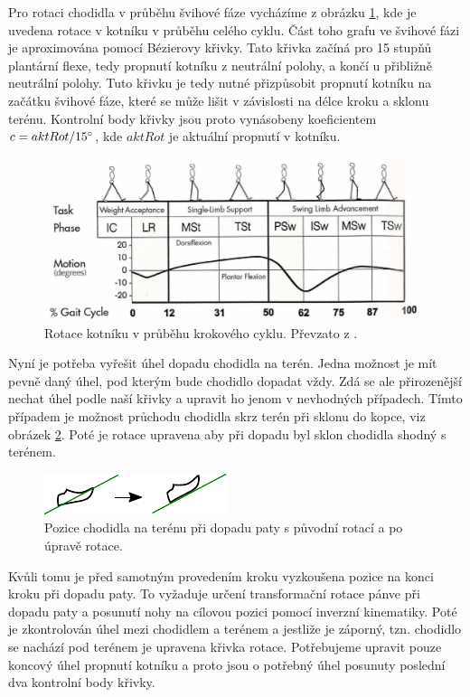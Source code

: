 Pro rotaci chodidla v průběhu švihové fáze vycházíme z obrázku \ref{fig:ankleRot}, kde je uvedena rotace v kotníku v průběhu celého cyklu. Část toho grafu ve švihové fázi je aproximována pomocí Bézierovy křivky. Tato křivka začíná pro 15 stupňů plantární flexe, tedy propnutí kotníku z neutrální polohy, a končí u přibližně neutrální polohy. Tuto křivku je tedy nutné přizpůsobit propnutí kotníku na začátku švihové fáze, které se může lišit v závislosti na délce kroku a sklonu terénu. Kontrolní body křivky jsou proto vynásobeny koeficientem $c = aktRot / 15\degree$, kde $aktRot$ je aktuální propnutí v kotníku. 

\begin{figure}[h]
	\centering
	\includegraphics[width=0.9\linewidth]{fig/ankle_kinematics.png}
	\caption{Rotace kotníku v průběhu krokového cyklu. Převzato z \cite{biomechanika_chuze}.}
	\label{fig:ankleRot}
\end{figure}

Nyní je potřeba vyřešit úhel dopadu chodidla na terén.  Jedna možnost je mít pevně daný úhel, pod kterým bude chodidlo dopadat vždy. Zdá se ale přirozenější nechat úhel podle naší křivky a upravit ho jenom v nevhodných případech. Tímto případem je možnost průchodu chodidla skrz terén při sklonu do kopce, viz obrázek \ref{fig:swingRotFix}. Poté je rotace upravena aby při dopadu byl sklon chodidla shodný s terénem. 

\begin{figure}[h]
	\centering
	\includegraphics[width=0.6\linewidth]{fig/foot_through_terrain.pdf}
	\caption{Pozice chodidla na terénu při dopadu paty s původní rotací a po úpravě rotace.}
	\label{fig:swingRotFix}
\end{figure}

Kvůli tomu je před samotným provedením kroku vyzkoušena pozice na konci kroku při dopadu paty. To vyžaduje určení transformační rotace pánve při dopadu paty a posunutí nohy na cílovou pozici pomocí inverzní kinematiky. Poté je zkontrolován úhel mezi chodidlem a terénem a jestliže je záporný, tzn. chodidlo se nachází pod terénem je upravena křivka rotace. Potřebujeme upravit pouze koncový úhel propnutí kotníku a proto jsou o potřebný úhel posunuty poslední dva kontrolní body křivky.

